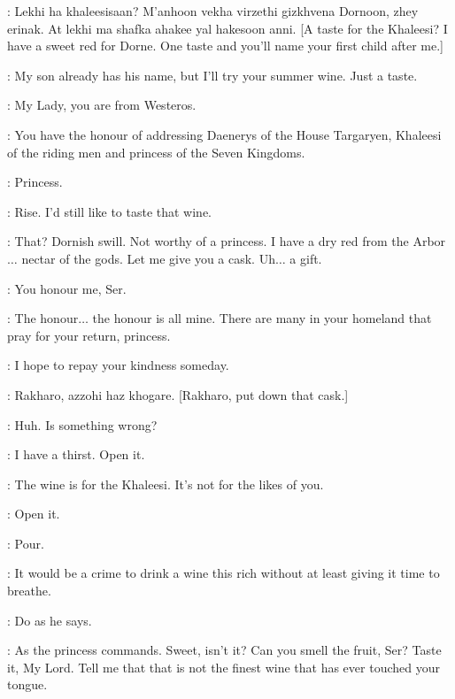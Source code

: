 
\WINESELLER: Lekhi ha khaleesisaan? M'anhoon vekha virzethi gizkhvena Dornoon, zhey erinak. At lekhi ma shafka ahakee yal hakesoon anni. [A taste for the Khaleesi? I have a sweet red for Dorne. One taste and you'll name your first child after me.] 

\DAENERYS: My son already has his name, but I'll try your summer wine. Just a taste. 

\WINESELLER: My Lady, you are from Westeros. 

\IRRI: You have the honour of addressing Daenerys of the House Targaryen, Khaleesi of the riding men and princess of the Seven Kingdoms. 

\WINESELLER:  Princess. 

\DAENERYS: Rise. I'd still like to taste that wine. 

\WINESELLER: That? Dornish swill. Not worthy of a princess. I have a dry red from the Arbor$\ldots$ nectar of the gods. Let me give you a cask. Uh$\ldots$ a gift. 

\DAENERYS: You honour me, Ser. 

\WINESELLER: The honour$\ldots$ the honour is all mine. There are many in your homeland that pray for your return, princess. 


\DAENERYS: I hope to repay your kindness someday. 


\JORAH: Rakharo, azzohi haz khogare. [Rakharo, put down that cask.] 

\DAENERYS: Huh. Is something wrong? 

\JORAH: I have a thirst. Open it. 

\WINESELLER: The wine is for the Khaleesi. It's not for the likes of you. 

\JORAH: Open it. 


\JORAH: Pour. 

\WINESELLER: It would be a crime to drink a wine this rich without at least giving it time to breathe. 

\DAENERYS: Do as he says. 

\WINESELLER: As the princess commands.  Sweet, isn't it? Can you smell the fruit, Ser? Taste it, My Lord. Tell me that that is not the finest wine that has ever touched your tongue. 

